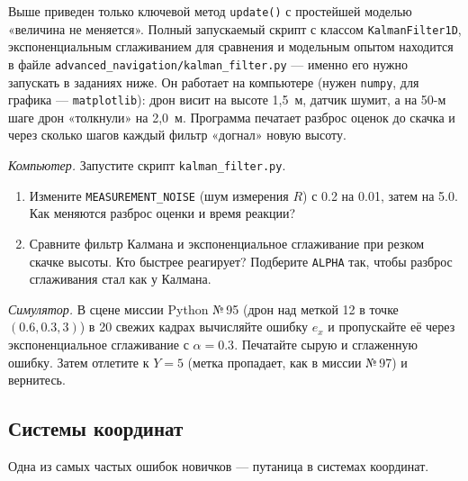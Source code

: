Выше приведен только ключевой метод \texttt{update()} с простейшей моделью «величина не меняется». Полный запускаемый скрипт с классом \texttt{KalmanFilter1D}, экспоненциальным сглаживанием для сравнения и модельным опытом находится в файле \texttt{advanced\_navigation/kalman\_filter.py} --- именно его нужно запускать в заданиях ниже. Он работает на компьютере (нужен \verb|numpy|, для графика --- \verb|matplotlib|): дрон висит на высоте 1,5~м, датчик шумит, а на 50-м шаге дрон «толкнули» на 2,0~м. Программа печатает разброс оценок до скачка и через сколько шагов каждый фильтр «догнал» новую высоту.

\begin{taskbox}
\emph{Компьютер.} Запустите скрипт \texttt{kalman\_filter.py}.
\begin{enumerate}
    \item Измените \texttt{MEASUREMENT\_NOISE} (шум измерения $R$) с 0.2 на 0.01, затем на 5.0. Как меняются разброс оценки и время реакции?
    \item Сравните фильтр Калмана и экспоненциальное сглаживание при резком скачке высоты. Кто быстрее реагирует? Подберите \texttt{ALPHA} так, чтобы разброс сглаживания стал как у Калмана.
\end{enumerate}
\end{taskbox}

\begin{taskbox}
\emph{Симулятор.} В сцене миссии Python №\,95 (дрон над меткой 12 в точке $(0.6, 0.3, 3)$) в 20 свежих кадрах вычисляйте ошибку $e_x$ и пропускайте её через экспоненциальное сглаживание с $\alpha = 0.3$. Печатайте сырую и сглаженную ошибку. Затем отлетите к $Y = 5$ (метка пропадает, как в миссии №\,97) и вернитесь.
\end{taskbox}

\subsection{Системы координат}
Одна из самых частых ошибок новичков — путаница в системах координат.

